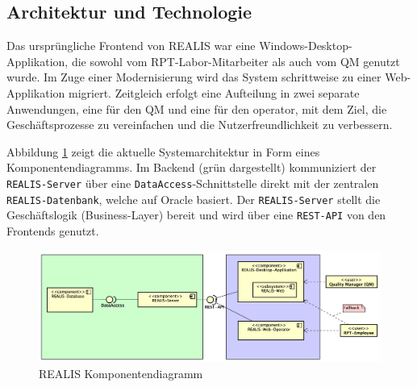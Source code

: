 \subsection{Architektur und Technologie}
Das ursprüngliche Frontend von REALIS war eine Windows-Desktop-Applikation, die sowohl vom \gls{RPT}-Labor-Mitarbeiter als auch vom \gls{QM} genutzt wurde. Im Zuge einer Modernisierung wird das System schrittweise zu einer Web-Applikation migriert. Zeitgleich erfolgt eine Aufteilung in zwei separate Anwendungen, eine für den \gls{QM} und eine für den \gls{operator}, mit dem Ziel, die Geschäftsprozesse zu vereinfachen und die Nutzerfreundlichkeit zu verbessern.

Abbildung \ref{fig:realis-komponentendiagramm} zeigt die aktuelle Systemarchitektur in Form eines Komponentendiagramms. Im Backend (grün dargestellt) kommuniziert der \texttt{REALIS-Server} über eine \texttt{DataAccess}-Schnittstelle direkt mit der zentralen \texttt{REALIS-Datenbank}, welche auf Oracle basiert. Der \texttt{REALIS-Server} stellt die Geschäftslogik (Business-Layer) bereit und wird über eine \texttt{REST-API} von den Frontends genutzt.

\begin{figure}[!h]
    \centering
    \includegraphics[width=1\textwidth]{bilder/REALIS-Komponentendiagramm2.png}
    \caption{REALIS Komponentendiagramm}
    \label{fig:realis-komponentendiagramm}
\end{figure}

